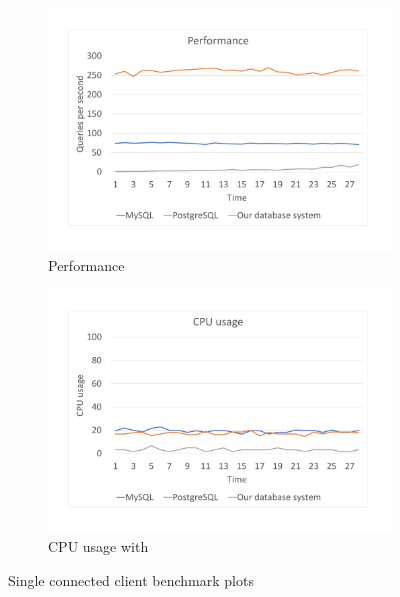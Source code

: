 \begin{figure}[h]
    \begin{subfigure}{.5\textwidth}
        \centering
        \includegraphics[trim={1.78cm 2cm 2.08cm 1cm},clip,width=1.0\linewidth]{excel/1per.pdf}
        \caption{Performance}
        \label{bench1per}
    \end{subfigure}
    \begin{subfigure}{.5\textwidth}
        \centering
        \includegraphics[trim={1.78cm 2cm 2.08cm 1cm},clip,width=1.0\linewidth]{excel/1cpu.pdf}
        \caption{CPU usage with}
        \label{bench1cpu}
    \end{subfigure}
    \caption{Single connected client benchmark plots}
\end{figure}



